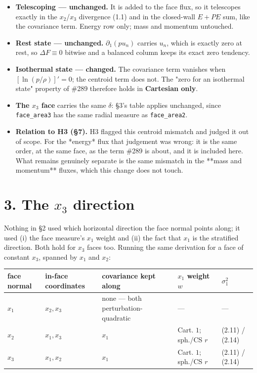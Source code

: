 \documentclass[11pt,a4paper]{article}
\begin{document}
\begin{itemize}
\item \textbf{Telescoping — unchanged.} It is added to the face flux, so it telescopes
  exactly in the $x_2$/$x_3$ divergence (1.1) and in the closed-wall $E+PE$ sum,
  like the covariance term. Energy row only; mass and momentum untouched.
\item \textbf{Rest state — unchanged.} $\partial_1(pu_n)$ carries $u_n$, which is exactly
  zero at rest, so $\Delta F\equiv0$ bitwise and a balanced column keeps its
  exact zero tendency.
\item \textbf{Isothermal state — changed.} The covariance term vanishes when
  $[\ln(p/\rho)]'=0$; the centroid term does not. The "zero for an isothermal
  state" property of \#289 therefore holds in \textbf{Cartesian only}.
\item \textbf{The $x_3$ face} carries the same $\delta$: §3's table applies unchanged,
  since \texttt{face\_area3} has the same radial measure as \texttt{face\_area2}.
\item \textbf{Relation to H3 (§7).} H3 flagged this centroid mismatch and judged it out
  of scope. For the *energy* flux that judgement was wrong: it is the same
  order, at the same face, as the term \#289 is about, and it is included here.
  What remains genuinely separate is the same mismatch in the **mass and
  momentum** fluxes, which this change does not touch.
\end{itemize}

\hrulefill

\section*{3. The $x_3$ direction}

Nothing in §2 used which horizontal direction the face normal points along; it
used (i) the face measure's $x_1$ weight and (ii) the fact that $x_1$ is the
stratified direction. Both hold for $x_3$ faces too. Running the same derivation
for a face of constant $x_3$, spanned by $x_1$ and $x_2$:

\begin{longtable}{lllll}
\toprule
face normal & in-face coordinates & covariance kept along & $x_1$ weight $w$ & $\sigma_1^2$ \\
\midrule
$x_1$ & $x_2,x_3$ & none — both perturbation-quadratic & — & — \\
$x_2$ & $x_1,x_3$ & $x_1$ & Cart. $1$; sph./CS $r$ & (2.11) / (2.14) \\
$x_3$ & $x_1,x_2$ & $x_1$ & Cart. $1$; sph./CS $r$ & (2.11) / (2.14) \\
\bottomrule
\end{longtable}
\end{document}
